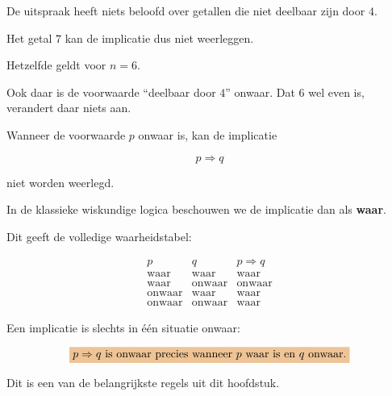 \documentclass{ximera}
\begin{document}
De uitspraak heeft niets beloofd over getallen die niet deelbaar zijn
door $4$.

Het getal $7$ kan de implicatie dus niet weerleggen.

Hetzelfde geldt voor $n=6$.

Ook daar is de voorwaarde ``deelbaar door $4$'' onwaar.
Dat $6$ wel even is, verandert daar niets aan.


\begin{opmerking}

Wanneer de voorwaarde $p$ onwaar is, kan de implicatie

\[
p\Rightarrow q
\]

niet worden weerlegd.

In de klassieke wiskundige logica beschouwen we de implicatie dan als
\textbf{waar}.

\end{opmerking}


Dit geeft de volledige waarheidstabel:

\[
\begin{array}{c|c|c}
p & q & p\Rightarrow q\\
\hline
\text{waar}   & \text{waar}   & \text{waar}\\
\text{waar}   & \text{onwaar} & \text{onwaar}\\
\text{onwaar} & \text{waar}   & \text{waar}\\
\text{onwaar} & \text{onwaar} & \text{waar}
\end{array}
\]


\begin{opmerking}

Een implicatie is slechts in één situatie onwaar:

\[
\important{
p\Rightarrow q
\text{ is onwaar precies wanneer }
p\text{ waar is en }q\text{ onwaar.}
}
\]

Dit is een van de belangrijkste regels uit dit hoofdstuk.

\end{opmerking}
\end{document}
